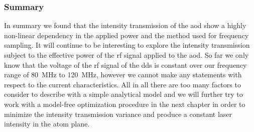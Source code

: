 \subsubsection{Summary}

In summary we found that the intensity transmission of the \gls{aod} show a
highly non-linear dependency in the applied power and the method used for
frequency sampling. It will continue to be interesting to explore the
intensity transmission subject to the effective power of the \gls{rf} signal
applied to the \gls{aod}. So far we only know that the voltage of the \gls{rf}
signal of the \gls{dds} is constant over our frequency range of
\SI{80}{\mega\hertz} to \SI{120}{\mega\hertz}, however we cannot make any
statements with respect to the current characteristics. All in all there are
too many factors to consider to describe with a simple analytical model and we
will further try to work with a model-free optimization procedure in the next
chapter in order to minimize the intensity transmission variance and produce
a constant laser intensity in the atom plane.
